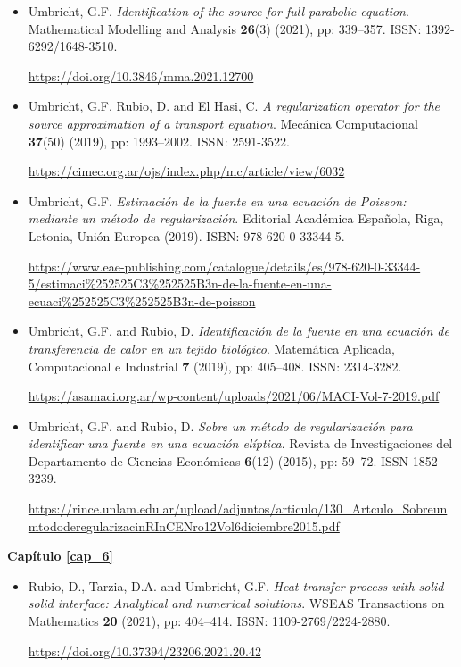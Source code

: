 \begin{itemize}

%
\item{Umbricht, G.F. {\em Identification of the source for full parabolic equation}. Mathematical Modelling and Analysis {\bf 26}(3) (2021), pp: 339--357. ISSN: 1392-6292/1648-3510.}

\url{https://doi.org/10.3846/mma.2021.12700}
%
%
\item{Umbricht, G.F, Rubio, D. and El Hasi, C. {\em A regularization operator for the source approximation of a transport equation}. Mec\'anica Computacional {\bf 37}(50) (2019), pp: 1993--2002. ISSN: 2591-3522. } 

\sloppy
\url{https://cimec.org.ar/ojs/index.php/mc/article/view/6032}
%
%
\item{Umbricht, G.F. {\em Estimaci\'on de la fuente en una ecuaci\'on de Poisson: mediante un m\'etodo de regularizaci\'on}. Editorial Acad\'emica Espa\~nola, Riga, Letonia, Uni\'on Europea (2019). 
ISBN: 978-620-0-33344-5.}

\sloppy
\url{https://www.eae-publishing.com/catalogue/details/es/978-620-0-33344-5/estimaci\%252525C3\%252525B3n-de-la-fuente-en-una-ecuaci\%252525C3\%252525B3n-de-poisson} 
%
%
\item{Umbricht, G.F. and Rubio, D. {\em Identificaci\'on de la fuente en una ecuaci\'on de transferencia de calor en un tejido biol\'ogico}. Matem\'atica Aplicada, Computacional e Industrial {\bf 7} (2019), pp: 405--408. ISSN: 2314-3282.}

\sloppy
\url{https://asamaci.org.ar/wp-content/uploads/2021/06/MACI-Vol-7-2019.pdf}

%
%
\item{Umbricht, G.F. and Rubio, D. {\em  Sobre un m\'etodo de regularizaci\'on para identificar una fuente en una ecuaci\'on el\'iptica}. Revista de Investigaciones del Departamento de Ciencias Econ\'omicas {\bf 6}(12) (2015), pp: 59--72. ISSN 1852-3239.}

\sloppy
\url{https://rince.unlam.edu.ar/upload/adjuntos/articulo/130_Artculo_SobreunmtododeregularizacinRInCENro12Vol6diciembre2015.pdf} 
%
\end{itemize}

{\bf Cap\'itulo \ref{cap_6}} 

\begin{itemize}

\item{Rubio, D., Tarzia, D.A. and Umbricht, G.F. {\em Heat transfer process with solid-solid interface: Analytical and numerical solutions}. WSEAS Transactions on Mathematics {\bf 20} (2021), pp: 404--414. ISSN: 1109-2769/2224-2880.}

\url{https://doi.org/10.37394/23206.2021.20.42}

\end{itemize}



